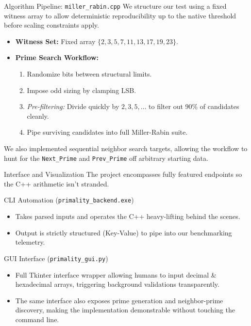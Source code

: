 \documentclass[10pt, compress]{beamer}
\begin{document}
\begin{frame}{Algorithm Pipeline: \texttt{miller\_rabin.cpp}}
    We structure our test using a fixed witness array to allow deterministic reproducibility up to the native threshold before scaling constraints apply.
    
    \pause
    \begin{itemize}
        \item \textbf{Witness Set:} Fixed array $\{2, 3, 5, 7, 11, 13, 17, 19, 23\}$.
        \item \textbf{Prime Search Workflow:}
            \begin{enumerate}
                \item Randomize bits between structural limits.
                \item Impose odd sizing by clamping LSB.
                \item \textit{Pre-filtering:} Divide quickly by $2, 3, 5, \dots$ to filter out 90\% of candidates cleanly.
                \item Pipe surviving candidates into full Miller-Rabin suite.
            \end{enumerate}
    \end{itemize}
    
    \pause
    We also implemented sequential neighbor search targets, allowing the workflow to hunt for the \texttt{Next\_Prime} and \texttt{Prev\_Prime} off arbitrary starting data.
\end{frame}
\begin{frame}{Interface and Visualization}
    The project encompasses fully featured endpoints so the C++ arithmetic isn't stranded.
    
    \pause
    \begin{block}{CLI Automation (\texttt{primality\_backend.exe})}
        \begin{itemize}
            \item Takes parsed inputs and operates the C++ heavy-lifting behind the scenes.
            \item Output is strictly structured (Key-Value) to pipe into our benchmarking telemetry.
        \end{itemize}
    \end{block}
    
    \pause
    \begin{block}{GUI Interface (\texttt{primality\_gui.py})}
        \begin{itemize}
            \item Full Tkinter interface wrapper allowing humans to input decimal \& hexadecimal arrays, triggering background validations transparently.
            \item The same interface also exposes prime generation and neighbor-prime discovery, making the implementation demonstrable without touching the command line.
        \end{itemize}
    \end{block}
\end{frame}
\end{document}
